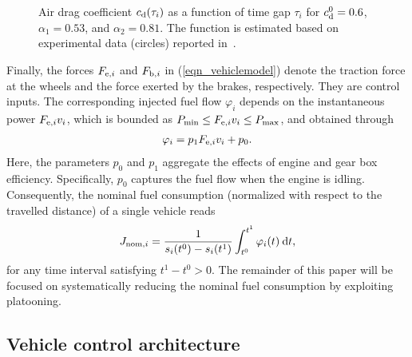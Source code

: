 \documentclass[journal]{IEEEtran}
\begin{document}
\begin{figure}
\begin{center}
\vskip-2mm\caption{Air drag coefficient $c_{\rm d}(\tau_i)$ as a function of time gap $\tau_i$ for $c_{\rm d}^0 = 0.6$, $\alpha_1 = 0.53$, and $\alpha_2 = 0.81$. The function is estimated based on experimental data (circles) reported in~\cite{book_hucho_1998}.}
  \label{fig_airdragcoefficient}
\end{center}
\end{figure}

Finally, the forces $F_{\text{\rm e},i}$ and $F_{\text{\rm b},i}$ in (\ref{eqn_vehiclemodel}) denote the traction force at the wheels and the force exerted by the brakes, respectively. They are control inputs. The corresponding injected fuel flow $\varphi_i$ depends on the instantaneous power $F_{\text{\rm e},i}v_i$, which is bounded as $P_{\text{\rm min}} \leq F_{\text{\rm e},i}v_i \leq P_{\text{\rm max}}$, and obtained through
\begin{align}
\varphi_i = p_1F_{\text{\rm e},i}v_i + p_0.
\label{eqn_fuelflow}
\end{align}
Here, the parameters $p_0$ and $p_1$ aggregate the effects of engine and gear box efficiency. Specifically, $p_0$ captures the fuel flow when the engine is idling. Consequently, the nominal fuel consumption (normalized with respect to the travelled distance) of a single vehicle reads
\begin{align}
J_{\text{\rm nom},i} = \frac{1}{s_i(t^0) - s_i(t^1)}\int_{t^0}^{t^1} \varphi_i(t) \:\mathrm{d} t,
\end{align}
for any time interval satisfying $t^1-t^0>0$. The remainder of this paper will be focused on systematically reducing the nominal fuel consumption by exploiting platooning.


\subsection{Vehicle control architecture}\label{sec_vehiclecontrolarchitecture}
\end{document}

